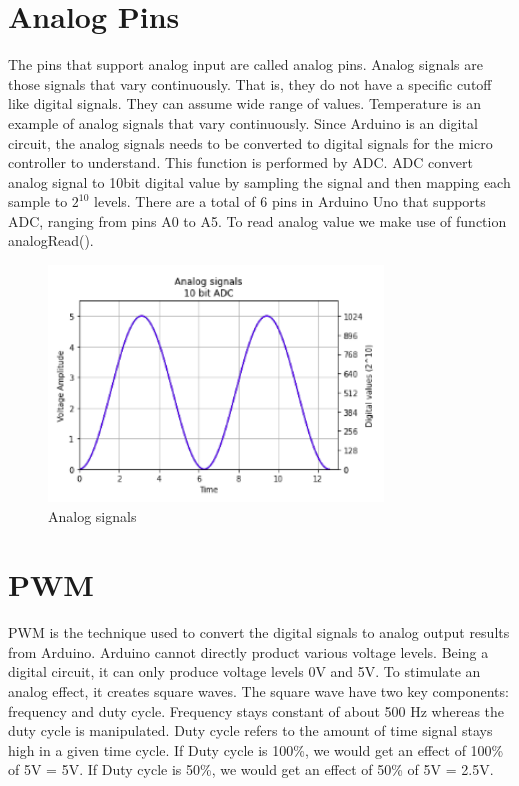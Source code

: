 \section{Analog Pins}
\par The pins that support analog input are called analog pins. Analog signals are those signals that vary continuously. That is, they do not have a specific cutoff like digital signals. They can assume wide range of values. Temperature is an example of analog signals that vary continuously. Since Arduino is an digital circuit, the analog signals needs to be converted to digital signals for the micro controller to understand. This function is performed by \ac{ADC}. \ac{ADC} convert analog signal to 10bit digital value by sampling the signal and then mapping each sample to $2^{10}$ levels. There are a total of 6 pins in Arduino Uno that supports \ac{ADC}, ranging from pins A0 to A5. To read analog value we make use of function analogRead().

\begin{figure}
 \centering
 \includegraphics[width=3.5in]{Images/Intro_Arduino/analog_graph.png}
 \caption{Analog signals}
\end{figure}

\section{\ac{PWM}}
\ac{PWM} is the technique used to convert the digital signals to analog output results from Arduino. Arduino cannot directly product various voltage levels. Being a digital circuit, it can only produce voltage levels 0V and 5V. To stimulate an analog effect, it creates square waves. The square wave have two key components: frequency and duty cycle. Frequency stays constant of about 500 Hz whereas the duty cycle is manipulated. Duty cycle refers to the amount of time signal stays high in a given time cycle. If Duty cycle is 100\%, we would get an effect of 100\% of 5V = 5V. If Duty cycle is 50\%, we would get an effect of 50\% of 5V = 2.5V. 

